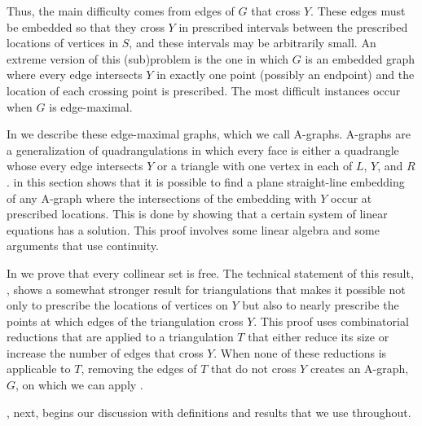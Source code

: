 Thus, the main difficulty comes from edges of $G$ that cross $Y$.
These edges must be embedded so that they cross $Y$ in prescribed
intervals between the prescribed locations of vertices in $S$, and
these intervals may be arbitrarily small.  An extreme version of this
(sub)problem is the one in which $G$ is an embedded graph where every
edge intersects $Y$ in exactly one point (possibly an endpoint) and
the location of each crossing point is prescribed.  The most difficult
instances occur when $G$ is edge-maximal.

In  we describe these edge-maximal graphs, which
we call A-graphs.  A-graphs are a generalization of quadrangulations in
which every face is either a quadrangle whose every edge intersects $Y$ or a triangle with one vertex in
each of $L$, $Y$, and $R$.   in this section shows that it
is possible to find a plane straight-line embedding of any A-graph where
the intersections of the embedding with $Y$ occur at prescribed locations.
This is done by showing that a certain system of linear equations has
a solution. This proof involves some linear algebra and some arguments
that use continuity.

In  we prove that every collinear set is free.
The technical statement of this result, , shows a somewhat
stronger result for triangulations that makes it possible not only to
prescribe the locations of vertices on $Y$ but also to nearly prescribe the
points at which edges of the triangulation cross $Y$.  This proof uses combinatorial
reductions that are applied to a triangulation $T$ that either reduce its
size or increase the number of edges that cross $Y$.  When none of these
reductions is applicable to $T$, removing the edges of $T$ that do not
cross $Y$ creates an A-graph, $G$, on which we can apply .

, next, begins our discussion with definitions and results that we use throughout.
